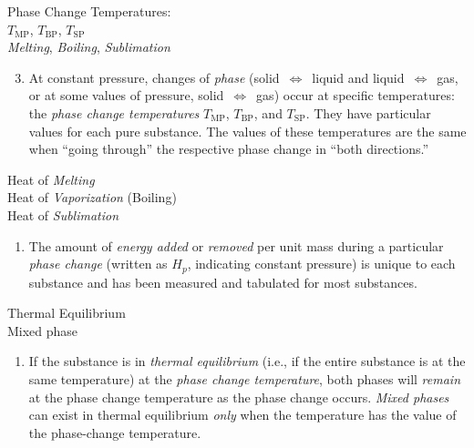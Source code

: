 \noindent
\begin{minipage}[c]{\leftcolumn}
	\baselineskip
	Phase Change Temperatures:\\
	\hspace*{5mm}$T_\text{MP}$, $T_\text{BP}$, $T_\text{SP}$\\
	\emph{Melting}, \emph{Boiling}, \emph{Sublimation}
\end{minipage}
\begin{minipage}[c]{\rightcolumn}
\begin{enumerate}\setcounter{enumi}{2}
	\item At constant pressure, changes of {\em phase} (solid~$\Leftrightarrow$~liquid and liquid~$\Leftrightarrow$~gas, or at some values of pressure, solid~$\Leftrightarrow$~gas) occur at specific temperatures: the \emph{phase change temperatures} $T_\text{MP}$, $T_\text{BP}$, and $T_\text{SP}$. They have particular values for each pure substance. The values of these temperatures are the same when ``going through'' the respective phase change in ``both directions.''\\[0.2mm]
	\end{enumerate}
\end{minipage}

\noindent
\begin{minipage}[c]{\leftcolumn}
	\baselineskip
	Heat of \emph{Melting}\\
	Heat of \emph{Vaporization} (Boiling)\\
	Heat of \emph{Sublimation}\\[0.1mm]
\end{minipage}
\begin{minipage}[c]{\rightcolumn}
	\begin{enumerate}
		\item[] The amount of \emph{energy added} or \emph{removed} per unit mass during a particular \emph{phase change} (written as $H_p$, indicating constant pressure) is unique to each substance and has been measured and tabulated for most substances.\\[0.2mm]
	\end{enumerate}
\end{minipage}

\noindent
\begin{minipage}[c]{\leftcolumn}
	\baselineskip
	Thermal Equilibrium\\
	Mixed phase
\end{minipage}
\begin{minipage}[c]{\rightcolumn}
	\begin{enumerate}
		\item[] If the substance is in \emph{thermal equilibrium} (i.e., if the entire substance is at the same temperature) at the \emph{phase change temperature}, both phases will \emph{remain} at the phase change temperature as the phase change occurs. \emph{Mixed phases} can exist in thermal equilibrium {\em only} when the temperature has the value of the phase-change temperature.\\[0.2mm]
	\end{enumerate}
\end{minipage}

